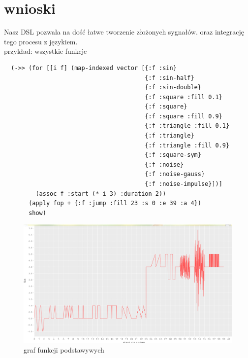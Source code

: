 \documentclass[12pt]{article}
\begin{document}
\section{wnioski}

Nasz DSL pozwala na dość łatwe tworzenie złożonych sygnałów. oraz
integrację tego procesu z językiem. \\

przykład: wszystkie funkcje
\begin{verbatim}
  (->> (for [[i f] (map-indexed vector [{:f :sin}
                                        {:f :sin-half}
                                        {:f :sin-double}
                                        {:f :square :fill 0.1}
                                        {:f :square}
                                        {:f :square :fill 0.9}
                                        {:f :triangle :fill 0.1}
                                        {:f :triangle}
                                        {:f :triangle :fill 0.9}
                                        {:f :square-sym}
                                        {:f :noise}
                                        {:f :noise-gauss}
                                        {:f :noise-impulse}])]
         (assoc f :start (* i 3) :duration 2))
       (apply fop + {:f :jump :fill 23 :s 0 :e 39 :a 4})
       show)
\end{verbatim}
\begin{figure}[H]
	\includegraphics[width=\linewidth]{wszystkie.png}
	\caption{graf funkcji podstawywych}
\end{figure}
\end{document}
